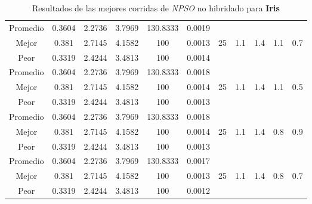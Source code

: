 \begin{table}[h!]
\begin{center}
\begin{tabular}{|c|c|c|c|c|c|c|c|c|c|c|}
        \hline
        \hline
            Promedio  & 0.3604 & 2.2736 & 3.7969 & 130.8333 & 0.0019 &  &  &  &  & \\
            \cline{1-6}
            Mejor & 0.381 & 2.7145  & 4.1582 & 100 & 0.0013 & 25 & 1.1 & 1.4 & 1.1 & 0.7\\
            \cline{1-6}
            Peor & 0.3319 & 2.4244  & 3.4813 & 100 & 0.0014 &  &  &  &  & \\
        \hline
        \hline
            Promedio  & 0.3604 & 2.2736 & 3.7969 & 130.8333 & 0.0018 &  &  &  &  & \\
            \cline{1-6}
            Mejor & 0.381 & 2.7145  & 4.1582 & 100 & 0.0014 & 25 & 1.1 & 1.4 & 1.1 & 0.5\\
            \cline{1-6}
            Peor & 0.3319 & 2.4244  & 3.4813 & 100 & 0.0013 &  &  &  &  & \\
        \hline
        \hline
            Promedio  & 0.3604 & 2.2736 & 3.7969 & 130.8333 & 0.0018 &  &  &  &  & \\
            \cline{1-6}
            Mejor & 0.381 & 2.7145  & 4.1582 & 100 & 0.0014 & 25 & 1.1 & 1.4 & 0.8 & 0.9\\
            \cline{1-6}
            Peor & 0.3319 & 2.4244  & 3.4813 & 100 & 0.0013 &  &  &  &  & \\
        \hline
        \hline
            Promedio  & 0.3604 & 2.2736 & 3.7969 & 130.8333 & 0.0017 &  &  &  &  & \\
            \cline{1-6}
            Mejor & 0.381 & 2.7145  & 4.1582 & 100 & 0.0013 & 25 & 1.1 & 1.4 & 0.8 & 0.7\\
            \cline{1-6}
            Peor & 0.3319 & 2.4244  & 3.4813 & 100 & 0.0012 &  &  &  &  & \\
        \hline
        \end{tabular}
        \caption{Resultados de las mejores corridas de \emph{NPSO} no hibridado para {\bf Iris}}
        \label{tb:tablepsoalgcsv}
    \end{center}
\end{table}


